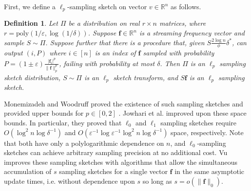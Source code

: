 \documentclass{report}
\newtheorem{definition}{Definition}[section]
\newcommand{\algoname}[1]{\textnormal{\textsc{#1}}}
\newcommand{\poly}{\mathrm{poly}}
\begin{document}
First, we define a $\ell_p$-sampling sketch on vector $v \in \mathbb{R}^n$ as follows.
%
\begin{definition}
Let $\Pi$ be a distribution on real $r \times n$ matrices, where $r = \poly(1/\varepsilon, \log(1/\delta))$. 
Suppose $\mathbf{f} \in \mathbb{R}^n$ is a streaming frequency vector and sample $S \sim \Pi$. 
Suppose further that there is a procedure that, given $S\frac{2\log n}{\phi}\delta^*$, can output $(i,P)$ where $i \in [n]$ is an index of $\mathbf{f}$ sampled with probability $P = (1 \pm \varepsilon)\frac{|\mathbf{f}_i|^p}{\|\mathbf{f}\|^p_p}$, failing with probability at most $\delta$. 
Then $\Pi$ is an $\ell_p$ sampling sketch distribution, $S \sim \Pi$ is an $\ell_p$ sketch transform, and $S\mathbf{f}$ is an $\ell_p$ sampling sketch.
\end{definition}
%

Monemizadeh and Woodruff proved the existence of such sampling sketches and provided upper bounds for $p \in [0,2]$ \cite{monemizadeh20101}.
Jowhari et al. \cite{jowhari2011tight} improved upon these space bounds.
In particular, they proved that $\ell_0$ and $\ell_1$ sampling sketches require $O(\log^2 n \log \delta^{-1})$ and $O(\varepsilon^{-1} \log \varepsilon^{-1} \log^2 n \log \delta^{-1})$ space, respectively.
Note that both have only a polylogarithmic dependence on $n$, and $\ell_0$-sampling sketches can achieve arbitrary sampling precision at no additional cost. 
Vu improves these sampling sketches with algorithms that allow the simultaneous accumulation of $s$ sampling sketches for a single vector $\mathbf{f}$ in the same asymptotic update times, i.e. without dependence upon $s$ so long as $s = o(\|\mathbf{f}\|_0)$.
\end{document}
